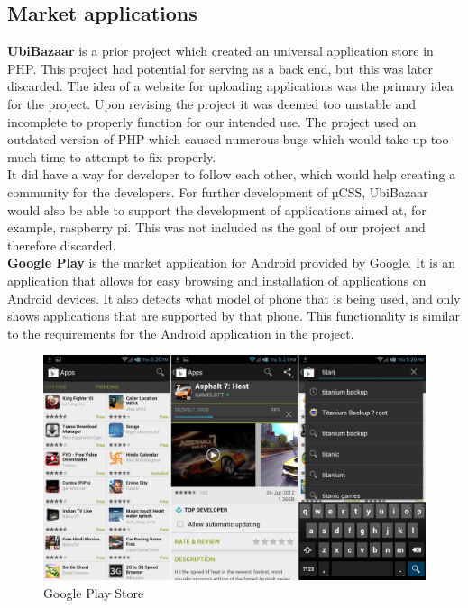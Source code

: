 \subsection{Market applications}

{\bf UbiBazaar} is a prior project which created an universal application store in PHP. This project had potential for serving as a back end, but this was later discarded. The idea of a website for uploading applications was the primary idea for the project. Upon revising the project it was deemed too unstable and incomplete to properly function for our intended use. The project used an outdated version of PHP which caused numerous bugs which would take up too much time to attempt to fix properly.\\

It did have a way for developer to follow each other, which would help creating a community for the developers. For further development of µCSS, UbiBazaar would also be able to support the development of applications aimed at, for example, raspberry pi. This was not included as the goal of our project and therefore discarded.\\

{\bf Google Play} is the market application for Android provided by Google. It is an application that allows for easy browsing and installation of applications on Android devices. It also detects what model of phone that is being used, and only shows applications that are supported by that phone. This functionality is similar to the requirements for the Android application in the project.
\\

\begin{figure}[H]
\includegraphics[scale=0.2]{images/Google-Play-Store-APK-3-7-15.jpg}
\caption{Google Play Store}
\end{figure}

